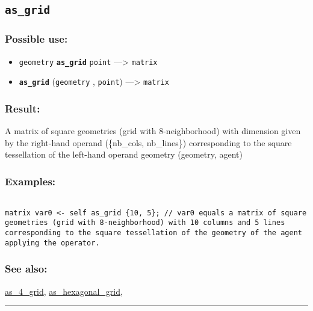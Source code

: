 \documentclass[]{book}
\providecommand{\tightlist}{%
  \setlength{\itemsep}{0pt}\setlength{\parskip}{0pt}}
\theoremstyle{definition}
\theoremstyle{definition}
\theoremstyle{definition}
\theoremstyle{remark}
\begin{document}
\subsection{\texorpdfstring{\texttt{as\_grid}}{as\_grid}}\label{as_grid}

\subsubsection{Possible use:}\label{possible-use-48}

\begin{itemize}
\tightlist
\item
  \texttt{geometry} \textbf{\texttt{as\_grid}} \texttt{point}
  ---\textgreater{} \texttt{matrix}
\item
  \textbf{\texttt{as\_grid}} (\texttt{geometry} , \texttt{point})
  ---\textgreater{} \texttt{matrix}
\end{itemize}

\subsubsection{Result:}\label{result-47}

A matrix of square geometries (grid with 8-neighborhood) with dimension
given by the right-hand operand (\{nb\_cols, nb\_lines\}) corresponding
to the square tessellation of the left-hand operand geometry (geometry,
agent)

\subsubsection{Examples:}\label{examples-39}

\begin{verbatim}
 
matrix var0 <- self as_grid {10, 5}; // var0 equals a matrix of square geometries (grid with 8-neighborhood) with 10 columns and 5 lines corresponding to the square tessellation of the geometry of the agent applying the operator.
\end{verbatim}

\subsubsection{See also:}\label{see-also-33}

\href{operators-a-to-a.html\#as_4_grid}{as\_4\_grid},
\href{operators-a-to-a.html\#as_hexagonal_grid}{as\_hexagonal\_grid},

\begin{center}\rule{0.5\linewidth}{\linethickness}\end{center}
\end{document}

